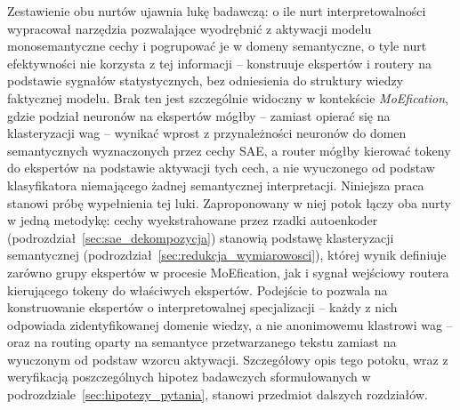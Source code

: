 Zestawienie obu nurtów ujawnia lukę badawczą: o ile nurt interpretowalności wypracował narzędzia pozwalające wyodrębnić z aktywacji modelu monosemantyczne cechy i pogrupować je w domeny semantyczne, o tyle nurt efektywności nie korzysta z tej informacji -- konstruuje ekspertów i routery na podstawie sygnałów statystycznych, bez odniesienia do struktury wiedzy faktycznej modelu. Brak ten jest szczególnie widoczny w kontekście \textit{MoEfication}, gdzie podział neuronów na ekspertów mógłby -- zamiast opierać się na klasteryzacji wag -- wynikać wprost z przynależności neuronów do domen semantycznych wyznaczonych przez cechy SAE, a router mógłby kierować tokeny do ekspertów na podstawie aktywacji tych cech, a nie wyuczonego od podstaw klasyfikatora niemającego żadnej semantycznej interpretacji. \newline
Niniejsza praca stanowi próbę wypełnienia tej luki. Zaproponowany w niej potok łączy oba nurty w jedną metodykę: cechy wyekstrahowane przez rzadki autoenkoder (podrozdział~\ref{sec:sae_dekompozycja}) stanowią podstawę klasteryzacji semantycznej (podrozdział~\ref{sec:redukcja_wymiarowosci}), której wynik definiuje zarówno grupy ekspertów w procesie MoEfication, jak i sygnał wejściowy routera kierującego tokeny do właściwych ekspertów. Podejście to pozwala na konstruowanie ekspertów o interpretowalnej specjalizacji -- każdy z nich odpowiada zidentyfikowanej domenie wiedzy, a nie anonimowemu klastrowi wag -- oraz na routing oparty na semantyce przetwarzanego tekstu zamiast na wyuczonym od podstaw wzorcu aktywacji. Szczegółowy opis tego potoku, wraz z weryfikacją poszczególnych hipotez badawczych sformułowanych w podrozdziale~\ref{sec:hipotezy_pytania}, stanowi przedmiot dalszych rozdziałów.